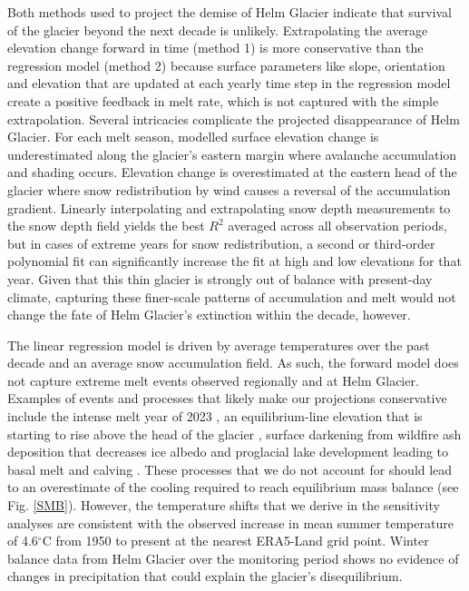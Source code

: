 \documentclass[annals,review,oneside]{igs}
\begin{document}
Both methods used to project the demise of Helm Glacier indicate that survival of the glacier beyond the next decade is unlikely. Extrapolating the average elevation change forward in time (method 1) is more conservative than the regression model (method 2) because surface parameters like slope, orientation and elevation that are updated at each yearly time step in the regression model create a positive feedback in melt rate, which is not captured with the simple extrapolation. Several intricacies complicate the projected disappearance of Helm Glacier. For each melt season, modelled surface elevation change is  underestimated along the glacier's eastern margin where avalanche accumulation and shading occurs. Elevation change is overestimated at the eastern head of the glacier where snow redistribution by wind causes a reversal of the accumulation gradient. Linearly interpolating and extrapolating snow depth measurements to the snow depth field yields the best $R^2$ averaged across all observation periods, but in cases of extreme years for snow redistribution, a second or third-order polynomial fit can significantly increase the fit at high and low elevations for that year. Given that this thin glacier is strongly out of balance with present-day climate, capturing these finer-scale patterns of accumulation and melt would not change the fate of Helm Glacier's extinction within the decade, however. 

The linear regression model is driven by average temperatures over the past decade and an average snow accumulation field. As such, the forward model does not capture extreme melt events observed regionally and at Helm Glacier. Examples of events and processes that likely make our projections conservative include the intense melt year of 2023 \citep{Menounos2025}, an equilibrium-line elevation that is starting to rise above the head of the glacier \citep{Bevington2025}, surface darkening from wildfire ash deposition that decreases ice albedo \citep{Menounos2025,AubryWake2022} and proglacial lake development leading to basal melt and calving \citep{Carrivick2013,Shugar2020}. These processes that we do not account for should lead to an overestimate of the cooling required to reach equilibrium mass balance (see Fig. \ref{SMB}). However, the temperature shifts that we derive in the sensitivity analyses are consistent with the observed increase in mean summer temperature of 4.6$^\circ$C from 1950 to present at the nearest ERA5-Land grid point. Winter balance data from Helm Glacier over the monitoring period shows no evidence of changes in precipitation that could explain the glacier's disequilibrium.
\end{document}
